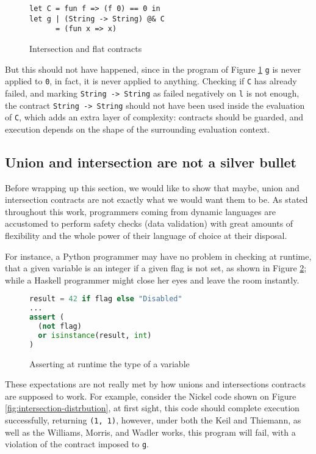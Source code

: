 \documentclass[sigplan,10pt,review,anonymous]{acmart}
\newcommand{\nickel}[1]{\lstinline[language=nickel]{#1}}
\begin{document}
\begin{figure}[h]
\begin{lstlisting}[language=nickel]
let C = fun f => (f 0) == 0 in
let g | (String -> String) @& C
      = (fun x => x) 
\end{lstlisting}
\caption{Intersection and flat contracts}
\label{fig:inter-flat-contracts}
\end{figure}

But this should not have happened, since in the program of Figure \ref{fig:inter-flat-contracts}
\nickel{g} is never applied to \nickel{0}, in fact, it is never applied
to anything.
Checking if \nickel{C} has already failed, and marking \nickel{String -> String} as
failed negatively on \nickel{l} is not enough, the contract \nickel{String -> String}
should not have been used inside the evaluation of \nickel{C}, which
adds an extra layer of complexity: contracts should be guarded, and execution
depends on the shape of the surrounding evaluation context.

\subsection*{Union and intersection are not a silver bullet}

Before wrapping up this section, we would like to show that maybe, union and intersection
contracts are not exactly what we would want them to be.
As stated throughout this work, programmers coming from dynamic languages
are accustomed to perform safety checks (data validation) with
great amounts of flexibility and the whole power of their
language of choice at their disposal.

For instance, a Python programmer may have no problem in checking
at runtime, that a given variable is an integer if a given flag is
not set, as shown in Figure \ref{fig:python-assertion};
while a Haskell programmer might close her eyes and leave the room
instantly.

\begin{figure}[h]
\begin{lstlisting}[language=python]
result = 42 if flag else "Disabled"
...
assert (
  (not flag) 
  or isinstance(result, int)
)
\end{lstlisting}
\caption{Asserting at runtime the type of a variable}
\label{fig:python-assertion}
\end{figure}

These expectations are not really met by how unions and intersections
contracts are supposed to work.
For example, consider the Nickel code shown on Figure
\ref{fig:intersection-distrbution}, at first sight, this code should
complete execution successfully, returning \nickel{(1, 1)},
however, under both the Keil and Thiemann, as well as the
Williams, Morris, and Wadler works, this program will fail, with a violation
of the contract imposed to \nickel{g}.
\end{document}
